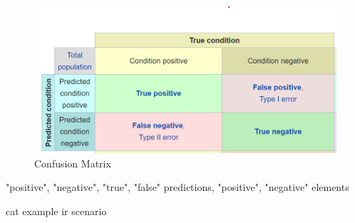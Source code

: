 \begin{figure}[t]
    \centering
    \includegraphics[width=\textwidth]{2_basics/4_metrics/1_confusion_matrix/matrix}
    \caption{Confusion Matrix}
    \label{fig:2_basics/4_metrics/1_confusion_matrix}
\end{figure}

"positive", "negative", "true", "false" predictions, "positive", "negative" elements

cat example
ir scenario
